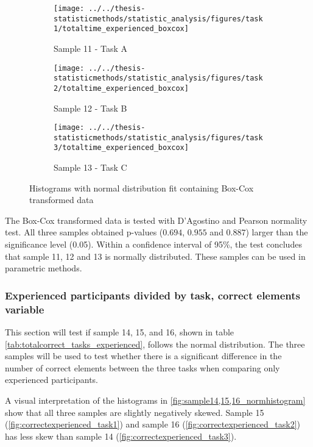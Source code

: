 \begin{figure}[H]
	\centering
	\begin{subfigure}[b]{0.32\textwidth}
		\centering
		\texttt{[image: ../../thesis-statisticmethods/statistic\_analysis/figures/task1/totaltime\_experienced\_boxcox]}
		\caption{Sample 11 - Task A}
		\label{fig:totaltimeexperiencedboxcox_task1}
	\end{subfigure}
	\begin{subfigure}[b]{0.32\textwidth}
		\centering
		\texttt{[image: ../../thesis-statisticmethods/statistic\_analysis/figures/task2/totaltime\_experienced\_boxcox]}
		\caption{Sample 12 - Task B}
		\label{fig:totaltimeexperiencedboxcox_task2}
	\end{subfigure}
	\begin{subfigure}[b]{0.32\textwidth}
		\centering
		\texttt{[image: ../../thesis-statisticmethods/statistic\_analysis/figures/task3/totaltime\_experienced\_boxcox]}
		\caption{Sample 13 - Task C}
		\label{fig:totaltimeexperiencedboxcox_task3}
	\end{subfigure}
	\caption{Histograms with normal distribution fit containing Box-Cox transformed data}
	\label{fig:sample11_12_13_boxcox_histogram}
\end{figure}

The Box-Cox transformed data is tested with D'Agostino and Pearson normality test. All three samples obtained p-values ($0.694$, $0.955$ and $0.887$) larger than the significance level (0.05). Within a confidence interval of 95\%, the test concludes that sample 11, 12 and 13 is normally distributed. These samples can be used in parametric methods.

\subsubsection[Sample 14, 15 and 16]{Experienced participants divided by task, correct elements variable}
This section will test if sample 14, 15, and 16, shown in table \ref{tab:totalcorrect_tasks_experienced}, follows the normal distribution. The three samples will be used to test whether there is a significant difference in the number of correct elements between the three tasks when comparing only experienced participants. 

A visual interpretation of the histograms in \ref{fig:sample14,15,16_normhistogram} show that all three samples are slightly negatively skewed. Sample 15 (\ref{fig:correctexperienced_task1}) and sample 16 (\ref{fig:correctexperienced_task2}) has less skew than sample 14 (\ref{fig:correctexperienced_task3}).   

